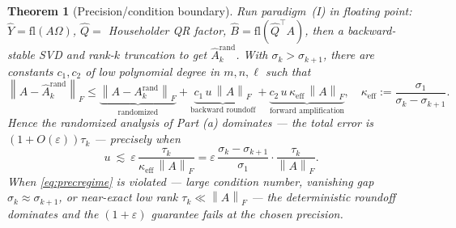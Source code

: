 \documentclass{amsart}
\newtheorem{theorem}{Theorem}
\theoremstyle{definition}
\newcommand{\Frob}[1]{\left\lVert #1\right\rVert_F}
\begin{document}
\begin{theorem}[Precision/condition boundary]\label{thm:precision}
Run paradigm~(I) in floating point: $\widehat Y=\mathrm{fl}(A\Omega)$,
$\widehat Q=$ Householder QR factor, $\widehat B=\mathrm{fl}(\widehat Q^\top A)$,
then a backward-stable SVD and rank-$k$ truncation to get
$\widehat A_k^{\mathrm{rand}}$. With $\sigma_k>\sigma_{k+1}$, there are constants
$c_1,c_2$ of low polynomial degree in $m,n,\ell$ such that
\begin{equation}\label{eq:fperr}
\Frob{A-\widehat A_k^{\mathrm{rand}}}
\le\underbrace{\Frob{A-A_k^{\mathrm{rand}}}}_{\text{randomized}}
+\underbrace{c_1\,u\,\Frob{A}}_{\text{backward roundoff}}
+\underbrace{c_2\,u\,\kappa_{\mathrm{eff}}\,\Frob{A}}_{\text{forward amplification}},
\quad
\kappa_{\mathrm{eff}}:=\frac{\sigma_1}{\sigma_k-\sigma_{k+1}} .
\end{equation}
Hence the randomized analysis of Part (a) dominates --- the total error is
$(1+O(\varepsilon))\tau_k$ --- precisely when
\begin{equation}\label{eq:precregime}
u\ \lesssim\ \varepsilon\,\frac{\tau_k}{\kappa_{\mathrm{eff}}\,\Frob{A}}
=\varepsilon\,\frac{\sigma_k-\sigma_{k+1}}{\sigma_1}\cdot\frac{\tau_k}{\Frob{A}} .
\end{equation}
When \eqref{eq:precregime} is violated --- large condition number, vanishing gap
$\sigma_k\approx\sigma_{k+1}$, or near-exact low rank $\tau_k\ll\Frob{A}$ ---
the deterministic roundoff dominates and the $(1+\varepsilon)$ guarantee fails
at the chosen precision.
\end{theorem}
\end{document}
